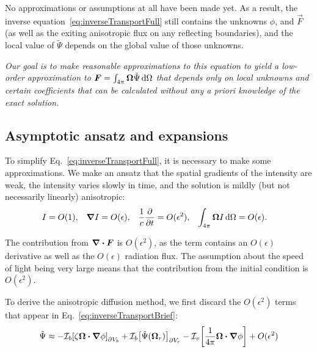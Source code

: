 
No approximations or assumptions at all have been made yet. As a
result, the inverse equation~\eqref{eq:inverseTransportFull} still contains
the unknowns $\phi$, and $\vec{F}$ (as well as the exiting anisotropic flux on
any reflecting boundaries), and the local value of
$\tilde\Psi$ depends on the global value of those unknowns.

\emph{
Our goal is to make reasonable approximations to this equation to yield a
low-order approximation to $\bm{F}=\int_{4\pi}\bm{\Omega} \tilde\Psi \mathop{}\!\mathrm{d}\Omega$ that
depends only on local unknowns and certain coefficients that can be calculated
without any \emph{a priori} knowledge of the exact solution.
}

\subsection{Asymptotic ansatz and expansions}
To simplify Eq.~\eqref{eq:inverseTransportFull}, it is necessary to make some
approximations. We make an ansatz that the spatial gradients of the intensity
are weak, the intensity varies slowly in time, and the solution is mildly
(but not necessarily linearly) anisotropic:
\begin{align} \label{eq:ansatz}
  I &= O(1), &
  \bm{\nabla} I &= O(\epsilon), &
  \frac{1}{c}\frac{\partial }{\partial t} &= O(\epsilon^2), &
  \int_{4\pi} \bm{\Omega} I\mathop{}\!\mathrm{d}\Omega &= O(\epsilon).
\end{align}

The contribution from $\bm{\nabla} \bm{\cdot}\bm{F}$ is $O(\epsilon^2)$, as the term
contains an $O(\epsilon)$ derivative as well as the $O(\epsilon)$ radiation
flux.  The assumption about the speed of light being very large means that the
contribution from the initial condition is $O(\epsilon^2)$.

To derive the anisotropic diffusion method, we first discard the $O(\epsilon^2)$
terms that appear in Eq.~\eqref{eq:inverseTransportBrief}:
\begin{equation} \label{eq:approxPsi1}
  \tilde\Psi \approx 
  -\mathcal{I}_{b}\!\left[\zeta \bm{\Omega}\bm{\cdot} \bm{\nabla} \phi\right]_{\partial V_b}
  + \mathcal{I}_{b}\!\left[\tilde\Psi(\bm{\Omega}_r)\right]_{\partial V_r}
  - \mathcal{I}_{v}\!\left[\frac{1}{4\pi} \bm{\Omega}\bm{\cdot} \bm{\nabla} \phi\right]
  + O(\epsilon^2)
\end{equation}

